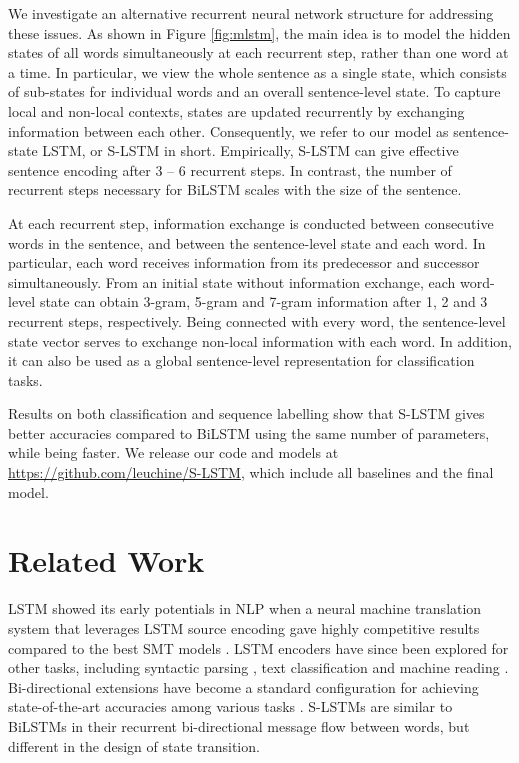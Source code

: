 \documentclass[11pt,a4paper]{article}
\begin{document}
We investigate an alternative recurrent neural network structure for addressing these issues.
As shown in Figure \ref{fig:mlstm}, the main idea is to model the hidden states of all words simultaneously at each recurrent step, rather than one word at a time. 
In particular, we view the whole sentence as a single state, which consists of sub-states for individual words and an overall sentence-level state. 
To capture local and non-local contexts, states are updated recurrently by exchanging information between each other. 
Consequently, we refer to our model as sentence-state LSTM, or S-LSTM in short. 
Empirically, S-LSTM can give effective sentence encoding after 3 -- 6 recurrent steps. 
In contrast, the number of recurrent steps necessary for BiLSTM scales with the size of the sentence. 


At each recurrent step, information exchange is conducted between consecutive words in the sentence, and between the sentence-level state and each word. 
In particular, each word receives information from its predecessor and successor simultaneously. 
From an initial state without information exchange, each word-level state can obtain 3-gram, 5-gram and 7-gram information after 1, 2 and 3 recurrent steps, respectively. 
Being connected with every word, the sentence-level state vector serves to exchange non-local information with each word. 
In addition, it can also be used as a global sentence-level representation for classification tasks. 


Results on both classification and sequence labelling show that S-LSTM gives better accuracies compared to BiLSTM using the same number of parameters, while being faster. We release our code and models at \url{https://github.com/leuchine/S-LSTM}, which include all baselines and the final model.


\section{Related Work}


LSTM \cite{graves2005framewise} showed its early potentials in NLP when a neural machine translation system that leverages LSTM source encoding gave highly competitive results compared to the best SMT models \cite{bahdanau2014neural}. 
LSTM encoders have since been explored for other tasks, including syntactic parsing \cite{dyer2015transition}, text classification \cite{yang2016hierarchical} and machine reading \cite{hermann2015teaching}. 
Bi-directional extensions have become a standard configuration for achieving state-of-the-art accuracies among various tasks \cite{wen2015semantically,ma2016end,dozat2016deep}. 
S-LSTMs are similar to BiLSTMs in their recurrent bi-directional message flow between words, but different in the design of state transition.
\end{document}
